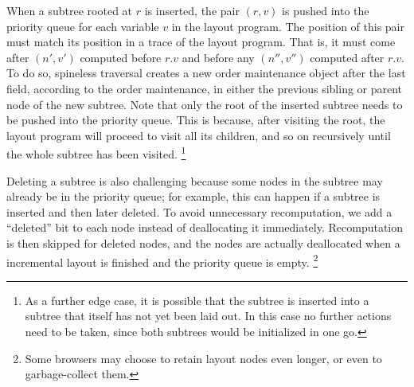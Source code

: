 When a subtree rooted at $r$ is inserted,
  the pair $(r, v)$ is pushed into the priority queue
  for each variable $v$ in the layout program.
The position of this pair must match
  its position in a trace of the layout program.
That is, it must come after $(n', v')$
  computed before $r.v$
  and before any $(n'', v'')$ computed after $r.v$.
To do so,
  spineless traversal creates a new order maintenance object
  after the last field, according to the order maintenance,
  in either the previous sibling or parent node of the new subtree.
Note that only the root of the inserted subtree
  needs to be pushed into the priority queue.
This is because, after visiting the root,
  the layout program will proceed to visit all its children,
  and so on recursively until the whole subtree has been visited.
\footnote{
  As a further edge case,
    it is possible that the subtree is inserted into
    a subtree that itself has not yet been laid out.
  In this case no further actions need to be taken,
    since both subtrees would be initialized in one go.}

Deleting a subtree is also challenging
  because some nodes in the subtree may already be in the priority queue;
  for example, this can happen if
  a subtree is inserted and then later deleted.
To avoid unnecessary recomputation,
  we add a ``deleted'' bit to each node
  instead of deallocating it immediately.
Recomputation is then skipped for deleted nodes,
  and the nodes are actually deallocated
  when a incremental layout is finished
  and the priority queue is empty.%
\footnote{Some browsers may choose
  to retain layout nodes even longer,
  or even to garbage-collect them.
}
